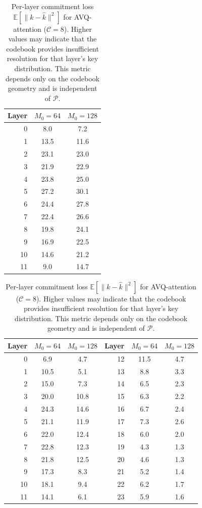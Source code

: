 \begin{table}[h]
\centering
\caption{Per-layer commitment loss $\mathbb{E}[\lVert k - \hat{k}\rVert^2]$ for AVQ-attention ($\mathcal{C}{=}8$). Higher values may indicate that the codebook provides insufficient resolution for that layer's key distribution. This metric depends only on the codebook geometry and is independent of $\mathcal{P}$.}
\label{tab:perlayer_imagenet}
\begin{minipage}[t]{0.30\linewidth}
\centering
{}
\begin{tabular}{r cc}
\toprule
Layer & $M_0{=}64$ & $M_0{=}128$ \\
\midrule
0  &  8.0 &  7.2 \\
1  & 13.5 & 11.6 \\
2  & 23.1 & 23.0 \\
3  & 21.9 & 22.9 \\
4  & 23.8 & 25.0 \\
5  & 27.2 & 30.1 \\
6  & 24.4 & 27.8 \\
7  & 22.4 & 26.6 \\
8  & 19.8 & 24.1 \\
9  & 16.9 & 22.5 \\
10 & 14.6 & 21.2 \\
11 &  9.0 & 14.7 \\
\bottomrule
\end{tabular}
\end{minipage}%
\hfill
\begin{minipage}[t]{0.66\linewidth}
\centering
{}
\begin{tabular}{r cc @{\hskip 12pt} r cc}
\toprule
Layer & $M_0{=}64$ & $M_0{=}128$ & Layer & $M_0{=}64$ & $M_0{=}128$ \\
\midrule
0  &  6.9 &  4.7 & 12 & 11.5 &  4.7 \\
1  & 10.5 &  5.1 & 13 &  8.8 &  3.3 \\
2  & 15.0 &  7.3 & 14 &  6.5 &  2.3 \\
3  & 20.0 & 10.8 & 15 &  6.3 &  2.2 \\
4  & 24.3 & 14.6 & 16 &  6.7 &  2.4 \\
5  & 21.1 & 11.9 & 17 &  7.3 &  2.6 \\
6  & 22.0 & 12.4 & 18 &  6.0 &  2.0 \\
7  & 22.8 & 12.3 & 19 &  4.3 &  1.3 \\
8  & 21.8 & 12.5 & 20 &  4.6 &  1.3 \\
9  & 17.3 &  8.3 & 21 &  5.2 &  1.4 \\
10 & 18.1 &  9.4 & 22 &  6.2 &  1.7 \\
11 & 14.1 &  6.1 & 23 &  5.9 &  1.6 \\
\bottomrule
\end{tabular}
\end{minipage}
\end{table}

